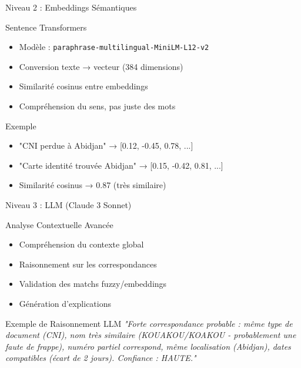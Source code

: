 \documentclass[aspectratio=169]{beamer}
\begin{document}
\begin{frame}{Niveau 2 : Embeddings Sémantiques}
    \begin{block}{Sentence Transformers}
        \begin{itemize}
            \item Modèle : \texttt{paraphrase-multilingual-MiniLM-L12-v2}
            \item Conversion texte → vecteur (384 dimensions)
            \item Similarité cosinus entre embeddings
            \item Compréhension du sens, pas juste des mots
        \end{itemize}
    \end{block}

    \vspace{0.3cm}

    \begin{exampleblock}{Exemple}
        \begin{itemize}
            \item "CNI perdue à Abidjan" → [0.12, -0.45, 0.78, ...]
            \item "Carte identité trouvée Abidjan" → [0.15, -0.42, 0.81, ...]
            \item Similarité cosinus → 0.87 (très similaire)
        \end{itemize}
    \end{exampleblock}
\end{frame}

\begin{frame}{Niveau 3 : LLM (Claude 3 Sonnet)}
    \begin{block}{Analyse Contextuelle Avancée}
        \begin{itemize}
            \item Compréhension du contexte global
            \item Raisonnement sur les correspondances
            \item Validation des matchs fuzzy/embeddings
            \item Génération d'explications
        \end{itemize}
    \end{block}

    \vspace{0.3cm}

    \begin{exampleblock}{Exemple de Raisonnement LLM}
        \small
        \textit{"Forte correspondance probable : même type de document (CNI), nom très similaire (KOUAKOU/KOAKOU - probablement une faute de frappe), numéro partiel correspond, même localisation (Abidjan), dates compatibles (écart de 2 jours). Confiance : HAUTE."}
    \end{exampleblock}
\end{frame}
\end{document}
